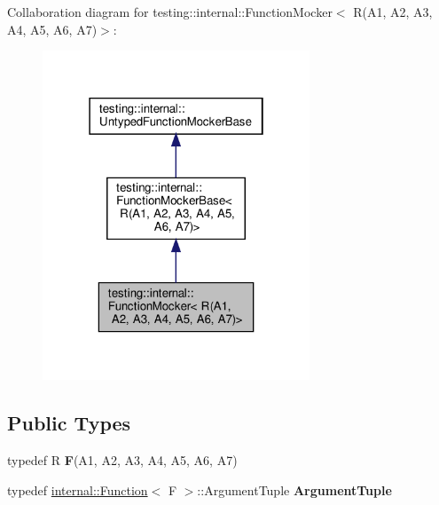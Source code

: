 Collaboration diagram for testing\+:\+:internal\+:\+:Function\+Mocker$<$ R(A1, A2, A3, A4, A5, A6, A7)$>$\+:
\nopagebreak
\begin{figure}[H]
\begin{center}
\leavevmode
\includegraphics[width=226pt]{classtesting_1_1internal_1_1_function_mocker_3_01_r_07_a1_00_01_a2_00_01_a3_00_01_a4_00_01_a5_00fe189f2cfc9654b435b5d92469ab8c0d}
\end{center}
\end{figure}
\subsection*{Public Types}
\begin{DoxyCompactItemize}
\item 
\mbox{\label{classtesting_1_1internal_1_1_function_mocker_3_01_r_07_a1_00_01_a2_00_01_a3_00_01_a4_00_01_a5_00_01_a6_00_01_a7_08_4_a2ea0e33d9cc0d1f57d58b4aee98c117c}} 
typedef R {\bfseries F}(A1, A2, A3, A4, A5, A6, A7)
\item 
\mbox{\label{classtesting_1_1internal_1_1_function_mocker_3_01_r_07_a1_00_01_a2_00_01_a3_00_01_a4_00_01_a5_00_01_a6_00_01_a7_08_4_a313911b9c80b57c8c25f0ad5ef2d0bdc}} 
typedef \hyperlink{structtesting_1_1internal_1_1_function}{internal\+::\+Function}$<$ F $>$\+::Argument\+Tuple {\bfseries Argument\+Tuple}
\end{DoxyCompactItemize}
